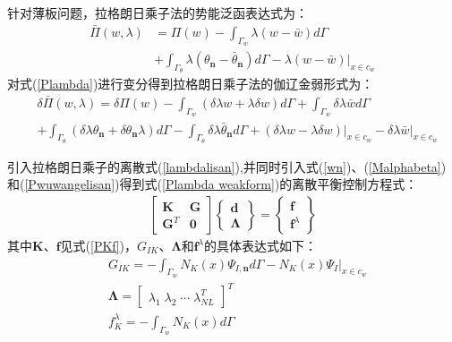 针对薄板问题，拉格朗日乘子法的势能泛函表达式为：
\begin{equation}\label{Plambda}
\begin{split}
    \bar{\Pi}(w,\lambda)&=\Pi(w)-\int_{\Gamma_w}\lambda(w-\bar{w})d\Gamma\\
    &+\int_{\Gamma_{\theta}}\lambda(\theta_{\pmb n}-\bar{\theta}_{\pmb n})d\Gamma-\lambda(w-\bar{w})\vert_{x\in c_w}
\end{split}
\end{equation}
对式(\ref{Plambda})进行变分得到拉格朗日乘子法的伽辽金弱形式为：
\begin{equation}\label{Plambda weakform}
\begin{split}
    &\delta\bar{\Pi}(w,\lambda)=\delta\Pi(w)-\int_{\Gamma_w}(\delta\lambda w+\lambda\delta w)d\Gamma+\int_{\Gamma_w}\delta\lambda\bar{w}d\Gamma\\
&+\int_{\Gamma_{\theta}}(\delta\lambda\theta_{\pmb n}+\delta\theta_{\pmb n}\lambda)d\Gamma-\int_{\Gamma_{\theta}}\delta\lambda\bar{\theta}_{\pmb n}d\Gamma
+(\delta\lambda w-\lambda\delta w)\vert_{x\in c_w}-\delta\lambda\bar{w}\vert_{x\in c_w}
\end{split}
\end{equation}\par
引入拉格朗日乘子的离散式(\ref{lambdalisan}),并同时引入式(\ref{wn})、(\ref{Malphabeta})和(\ref{Pwuwangelisan})得到式(\ref{Plambda weakform})的离散平衡控制方程式：
\begin{equation}
\begin{split}
        \left[\begin{matrix}\pmb{K}&\pmb{G}\\\pmb{G}^T&\pmb{0}\end{matrix}\right]
        \left\{\begin{matrix}\pmb{d}\\\pmb{\Lambda}\end{matrix}\right\}=
        \left\{\begin{matrix}\pmb{f}\\\pmb{f}^{\lambda}\end{matrix}\right\}
\end{split}
\end{equation}
其中$\pmb{K}$、$\pmb{f}$见式(\ref{PKf})，$G_{IK}$、$\pmb{\Lambda}$和$\pmb{f}^{\lambda}$的具体表达式如下：
\begin{equation}
\begin{split}
    &G_{I\!K}=-\int_{\Gamma_w}N_K(x)\Psi_{I,\pmb n}d\Gamma-N_K(x)\Psi_I\vert_{x\in c_w}\\
    &\pmb{\Lambda}= \left[\begin{matrix}\lambda_1\;\lambda_2\;\dotsb\;\lambda_{NL}^T\end{matrix}\right]^T\\
    &f_K^{\lambda}=-\int_{\Gamma_w}N_K(x)d\Gamma
\end{split}
\end{equation}\par
